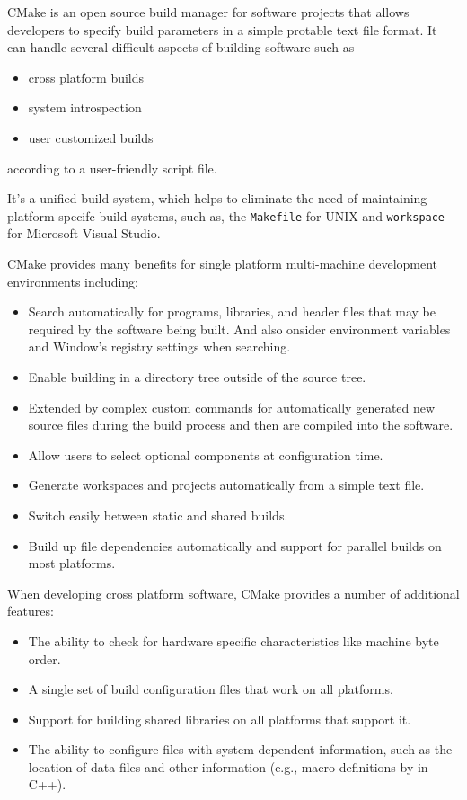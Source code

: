   CMake is an open source build manager for software projects that allows developers to specify build parameters in a simple protable text file format. It can handle several difficult aspects of building software such as 
  \begin{itemize}  
    \item cross platform builds
    \item system introspection
    \item user customized builds  
  \end{itemize}  
  according to a user-friendly script file. \par
  It's a unified build system, which helps to eliminate the need of maintaining platform-specifc build systems, such as, the \texttt{Makefile} for UNIX and \texttt{workspace} for Microsoft Visual Studio.\par
  CMake provides many benefits for single platform multi-machine development environments including:
	\begin{itemize}
    \item Search automatically for programs, libraries, and header files that may be required by the software being built. And also onsider environment variables and Window's registry settings when searching.
		\item Enable building in a directory tree outside of the source tree. 
		\item Extended by complex custom commands for automatically generated new source files during the build process and then are compiled into the software.
		\item Allow users to select optional components at configuration time. 
		\item Generate workspaces and projects automatically from a simple text file. 
		\item Switch easily between static and shared builds. 
		\item Build up file dependencies automatically and support for parallel builds on most platforms.
	\end{itemize}
	When developing cross platform software, CMake provides a number of additional features:
  \begin{itemize}
		\item The ability to check for hardware specific characteristics like machine byte order.
		\item A single set of build configuration files that work on all platforms. 
		\item Support for building shared libraries on all platforms that support it.
    \item The ability to configure files with system dependent information, such as the location of data files and other information (e.g., macro definitions by  in C++). 
	\end{itemize}
